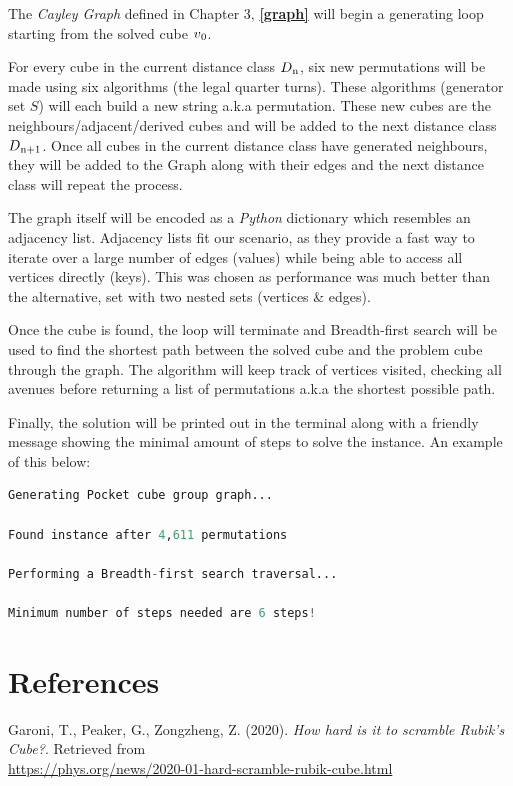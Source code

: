 \documentclass[a4paper]{article}
\begin{document}
\par The \emph{Cayley Graph} defined in Chapter 3, \textbf{\autoref{graph}} will begin a generating loop starting from the solved cube $v\textsubscript{0}$.

\par For every cube in the current distance class $D\textsubscript{n}$, six new permutations will be made using six algorithms (the legal quarter turns). These algorithms (generator set $S$) will each build a new string a.k.a permutation. These new cubes are the neighbours/adjacent/derived cubes and will be added to the next distance class $D\textsubscript{n+1}$. Once all cubes in the current distance class have generated neighbours, they will be added to the Graph along with their edges and the next distance class will repeat the process.

\par The graph itself will be encoded as a \emph{Python} dictionary which resembles an adjacency list. Adjacency lists fit our scenario, as they provide a fast way to iterate over a large number of edges (values) while being able to access all vertices directly (keys). This was chosen as performance was much better than the alternative, set with two nested sets (vertices \& edges).

\newpage

\par Once the cube is found, the loop will terminate and Breadth-first search will be used to find the shortest path between the solved cube and the problem cube through the graph. The algorithm will keep track of vertices visited, checking all avenues before returning a list of permutations a.k.a the shortest possible path. 

\par Finally, the solution will be printed out in the terminal along with a friendly message showing the minimal amount of steps to solve the instance. An example of this below:

\begin{lstlisting}[language=Python]
Generating Pocket cube group graph...

Found instance after 4,611 permutations

Performing a Breadth-first search traversal...

Minimum number of steps needed are 6 steps!
\end{lstlisting}

\section{References}
\par Garoni, T., Peaker, G., Zongzheng, Z. (2020). \emph{How hard is it to scramble Rubik's Cube?}. Retrieved from\\ \url{https://phys.org/news/2020-01-hard-scramble-rubik-cube.html}
\end{document}
